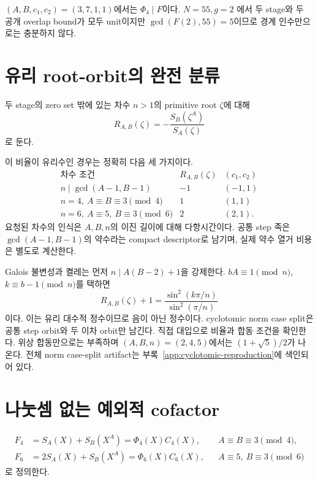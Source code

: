 \documentclass[11pt]{article}
\begin{document}
\((A,B,c_1,c_2)=(3,7,1,1)\)에서는 \(\Phi_4\mid F\)이다. \(N=55,g=2\)
에서 두 stage와 두 공개 overlap bound가 모두 unit이지만
\(\gcd(F(2),55)=5\)이므로 경계 인수만으로는 충분하지 않다.

\section{유리 root-orbit의 완전 분류}

두 stage의 zero set 밖에 있는 차수 \(n>1\)의 primitive root \(\zeta\)에
대해
\[
R_{A,B}(\zeta)=-\frac{S_B(\zeta^A)}{S_A(\zeta)}
\]
로 둔다.

{}
이 비율이 유리수인 경우는 정확히 다음
세 가지이다.
\[
\begin{array}{c|c|c}
\text{차수 조건}&R_{A,B}(\zeta)&(c_1,c_2)\\ \hline
n\mid\gcd(A-1,B-1)&-1&(-1,1)\\
n=4,\ A\equiv B\equiv3\pmod4&1&(1,1)\\
n=6,\ A\equiv5,\ B\equiv3\pmod6&2&(2,1).
\end{array}
\]
요청된 차수의 인식은 \(A,B,n\)의 이진 길이에 대해 다항시간이다.
공통 step 족은 \(\gcd(A-1,B-1)\)의 약수라는 compact descriptor로
남기며, 실제 약수 열거 비용은 별도로 계산한다.

\begin{claimproof}
Galois 불변성과 켤레는 먼저 \(n\mid A(B-2)+1\)을 강제한다.
\(bA\equiv1\pmod n\), \(k\equiv b-1\pmod n\)를 택하면
\[
R_{A,B}(\zeta)+1=
\frac{\sin^2(k\pi/n)}{\sin^2(\pi/n)}
\]
이다. 이는 유리 대수적 정수이므로 음이 아닌 정수이다. cyclotomic norm
case split은 공통 step orbit와 두 이차 orbit만 남긴다. 직접 대입으로
비율과 합동 조건을 확인한다. 위상 합동만으로는 부족하며
\((A,B,n)=(2,4,5)\)에서는 \((1+\sqrt5)/2\)가 나온다. 전체 norm
case-split artifact는 부록~\ref{app:cyclotomic-reproduction}에
색인되어 있다.
\end{claimproof}

\section{나눗셈 없는 예외적 cofactor}

\[
\begin{aligned}
F_4&=S_A(X)+S_B(X^A)=\Phi_4(X)C_4(X),
&&A\equiv B\equiv3\pmod4,\\
F_6&=2S_A(X)+S_B(X^A)=\Phi_6(X)C_6(X),
&&A\equiv5,\ B\equiv3\pmod6
\end{aligned}
\]
로 정의한다.
\end{document}
